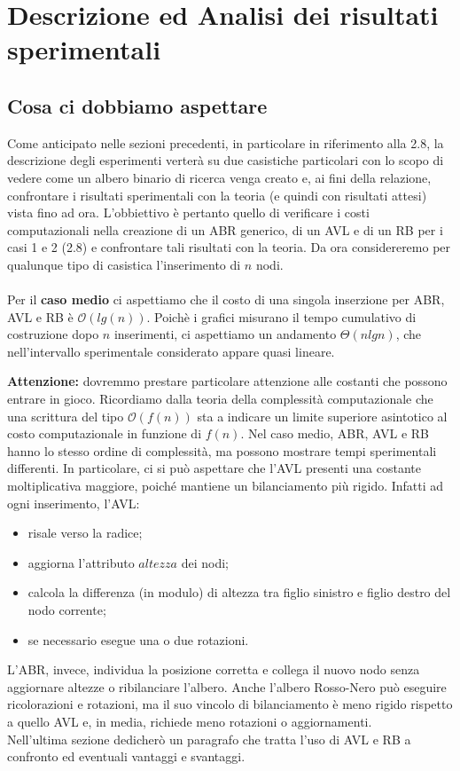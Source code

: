 \section{Descrizione ed Analisi dei risultati sperimentali}
\label{Sezione4}
\subsection{Cosa ci dobbiamo aspettare}
Come anticipato nelle sezioni precedenti, in particolare in riferimento alla 2.8, la descrizione degli esperimenti verterà su due casistiche particolari con lo scopo di vedere come un albero binario di ricerca venga creato e, ai fini della relazione, confrontare i risultati sperimentali con la teoria (e quindi con risultati attesi) vista fino ad ora.
L'obbiettivo è pertanto quello di verificare i costi computazionali nella creazione di un ABR generico, di un AVL e di un RB per i casi 1 e 2 (2.8) e confrontare tali risultati con la teoria. Da ora considereremo per qualunque tipo di casistica l'inserimento di $n$ nodi.\\ \\
Per il \textbf{caso medio} ci aspettiamo che il costo di una singola inserzione per ABR, AVL e RB è  $\mathcal{O}(lg(n))$. Poichè i grafici misurano il tempo cumulativo di costruzione dopo $n$ inserimenti, ci aspettiamo un andamento $\Theta(nlgn)$, che nell'intervallo sperimentale considerato appare quasi lineare.
\begin{tcolorbox}[colback=lightgray!20,%
	colframe=black,%
	arc=3mm, auto outer arc,] \textbf{Attenzione:} dovremmo prestare particolare attenzione alle costanti che possono entrare in gioco. Ricordiamo dalla teoria della complessità computazionale che una scrittura del tipo $\mathcal{O}(f(n))$ sta a indicare un limite superiore asintotico al costo computazionale in funzione di $f(n)$. Nel caso medio, ABR, AVL e RB hanno lo stesso ordine di complessità,
	ma possono mostrare tempi sperimentali differenti. In particolare, ci
	si può aspettare che l'AVL presenti una costante moltiplicativa maggiore, poiché mantiene un bilanciamento più rigido. Infatti ad ogni inserimento, l'AVL:
	\label{CostoAVL}
	\begin{itemize}
		\item risale verso la radice;
		\item aggiorna l'attributo $altezza$ dei nodi;
		\item calcola la differenza (in modulo) di altezza tra figlio sinistro e figlio destro del nodo corrente;
		\item se necessario esegue una o due rotazioni.		
	\end{itemize}
	L'ABR, invece, individua la posizione corretta e collega il nuovo nodo
	senza aggiornare altezze o ribilanciare l'albero. Anche l'albero
	Rosso-Nero può eseguire ricolorazioni e rotazioni, ma il suo vincolo di
	bilanciamento è meno rigido rispetto a quello AVL e, in media, richiede
	meno rotazioni o aggiornamenti. \\
	Nell'ultima sezione dedicherò un paragrafo che tratta l'uso di AVL e RB a confronto ed eventuali vantaggi e svantaggi. \\
\end{tcolorbox}

